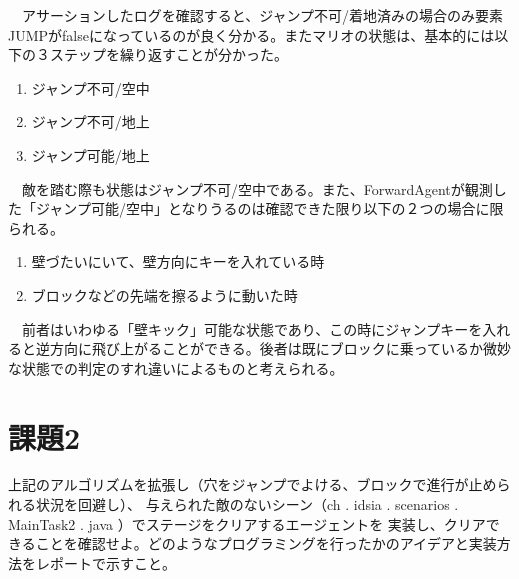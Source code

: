 \documentclass[a4j]{jarticle}
\begin{document}
\begin{description}
　アサーションしたログを確認すると、ジャンプ不可/着地済みの場合のみ要素JUMPがfalseになっているのが良く分かる。またマリオの状態は、基本的には以下の３ステップを繰り返すことが分かった。
\begin{enumerate}
 \item ジャンプ不可/空中
 \item ジャンプ不可/地上
 \item ジャンプ可能/地上
\end{enumerate}
　敵を踏む際も状態はジャンプ不可/空中である。また、ForwardAgentが観測した「ジャンプ可能/空中」となりうるのは確認できた限り以下の２つの場合に限られる。
\begin{enumerate}
 \item 壁づたいにいて、壁方向にキーを入れている時
 \item ブロックなどの先端を擦るように動いた時
\end{enumerate}
　前者はいわゆる「壁キック」可能な状態であり、この時にジャンプキーを入れると逆方向に飛び上がることができる。後者は既にブロックに乗っているか微妙な状態での判定のすれ違いによるものと考えられる。
\end{description}


\section{課題2}
\begin{screen}
  上記のアルゴリズムを拡張し（穴をジャンプでよける、ブロックで進行が止められる状況を回避し）、
与えられた敵のないシーン（ch . idsia . scenarios . MainTask2 . java ）でステージをクリアするエージェントを
実装し、クリアできることを確認せよ。どのようなプログラミングを行ったかのアイデアと実装方法をレポートで示すこと。
\end{screen}
\end{document}
